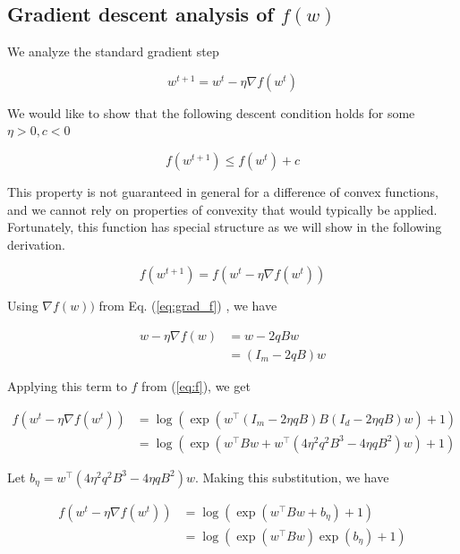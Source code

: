 \documentclass[11pt]{article}
\begin{document}
\subsection{Gradient descent analysis of $f(w)$}
\label{sec:grad_descent}

We analyze the standard gradient step

\begin{equation}
    w^{t+1} = w^t - \eta \nabla f(w^t)
\end{equation}

We would like to show that the following descent condition holds for some $\eta > 0, c < 0$

\begin{equation}
\label{eq:descent_condition}
    f(w^{t+1}) \leq f(w^t) + c
\end{equation}

This property is not guaranteed in general for a difference of convex functions, and we cannot rely on properties of convexity that would typically be applied. Fortunately, this function has special structure as we will show in the following derivation.

\begin{equation}
    f(w^{t+1}) = f(w^t - \eta \nabla f(w^t)) 
\end{equation}

Using $\nabla f(w))$ from Eq. (\ref{eq:grad_f}) , we have

\begin{align*}
    w - \eta \nabla f(w) &= w - 2qBw \\
    &= (I_m - 2qB)w
\end{align*}

Applying this term to $f$ from (\ref{eq:f}), we get

\begin{equation}
\begin{split}
    f(w^t - \eta \nabla f(w^t)) 
    &= \log(\exp(w^{\top}(I_m - 2 \eta qB)B(I_d - 2 \eta qB)w) + 1) \\
    &= \log(\exp(w^{\top}Bw + w^{\top} ( 4 \eta^2 q^2 B^3 - 4 \eta q B^2)w) + 1)
\end{split}
\end{equation}

Let $b_\eta = w^{\top} ( 4 \eta^2 q^2 B^3 - 4 \eta q B^2)w$. Making this substitution, we have

\begin{equation}
\begin{split}
    f(w^t - \eta \nabla f(w^t)) 
    &= \log(\exp(w^{\top}Bw + b_\eta ) + 1) \\
    &= \log(\exp(w^{\top}Bw)\exp(b_\eta ) + 1)
\end{split}
\end{equation}
\end{document}
